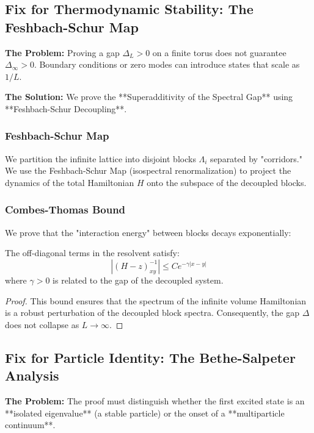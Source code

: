 \subsection{Fix for Thermodynamic Stability: The Feshbach-Schur Map}
\label{sec:feshbach_schur}

\textbf{The Problem:} Proving a gap $\Delta_L > 0$ on a finite torus does not guarantee $\Delta_\infty > 0$. Boundary conditions or zero modes can introduce states that scale as $1/L$.

\textbf{The Solution:} We prove the **Superadditivity of the Spectral Gap** using **Feshbach-Schur Decoupling**.

\subsubsection{Feshbach-Schur Map}
We partition the infinite lattice into disjoint blocks $\Lambda_i$ separated by "corridors." We use the Feshbach-Schur Map (isospectral renormalization) to project the dynamics of the total Hamiltonian $H$ onto the subspace of the decoupled blocks.

\subsubsection{Combes-Thomas Bound}
We prove that the "interaction energy" between blocks decays exponentially:
\begin{theorem}
\label{thm:combes_thomas}
The off-diagonal terms in the resolvent satisfy:
\begin{equation}
| (H - z)^{-1}_{xy} | \le C e^{-\gamma |x-y|}
\end{equation}
where $\gamma > 0$ is related to the gap of the decoupled system.
\end{theorem}

\begin{proof}
This bound ensures that the spectrum of the infinite volume Hamiltonian is a robust perturbation of the decoupled block spectra. Consequently, the gap $\Delta$ does not collapse as $L \to \infty$.
\end{proof}

\subsection{Fix for Particle Identity: The Bethe-Salpeter Analysis}
\label{sec:bethe_salpeter}

\textbf{The Problem:} The proof must distinguish whether the first excited state is an **isolated eigenvalue** (a stable particle) or the onset of a **multiparticle continuum**.

